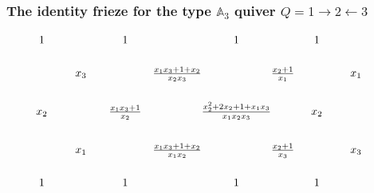 \documentclass[orientation=portrait]{beamer}
\begin{document}
\newcommand{\zehn}{\hspace{10pt}}
\newcommand{\fuenf}{\hspace{5pt}}
\newcommand{\fuenfm}{\hspace{-5pt}}






\begin{frame}
\frametitle{The identity frieze for the type $\mathbb{A}_3$ quiver $Q = 1\rightarrow 2 \leftarrow 3 $}
\large
\vskip -2cm
\[
\xymatrix@R-10pt@C-20pt{ 
1 &&
1 &&
1 &&
1 &&
\\
&\zehn x_3\zehn   &&
 \frac{x_1x_3+1+x_2}{x_2x_3}  &&
 \frac{x_2+1}{x_1}  &&
 \zehn x_1
 \zehn \\
\fuenf x_2\fuenf  &&
 \frac{x_1x_3+1}{x_2}  &&
\fuenfm \fuenfm \frac{x_2^2+2x_2+1+x_1x_3}{x_1x_2x_3}\fuenfm\fuenfm  &&
 \fuenf x_2\fuenf   &&
\\
& x_1  &&
  \frac{x_1x_3+1+x_2}{x_1x_2}  &&
  \frac{x_2+1}{x_3}  &&
 x_3 \\
 1 &&
1 &&
1 &&
1 &&
}
\]
\end{frame}
\end{document}
